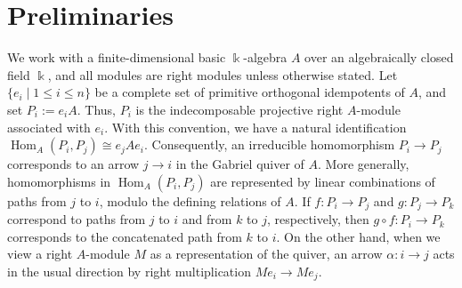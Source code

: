 \documentclass[a4,12pt]{amsart}
\numberwithin{equation}{section} %
\def\Hom{\operatorname{Hom}} %
\theoremstyle{definition} %
\begin{document}
\section{Preliminaries}\label{sec::preliminaries}
We work with a finite-dimensional basic $\Bbbk$-algebra $A$ over an algebraically closed field $\Bbbk$, and all modules are right modules unless otherwise stated. Let $\{e_i\mid 1\leq i\leq n\}$ be a complete set of primitive orthogonal idempotents of $A$, and set $P_i:=e_iA$. Thus, $P_i$ is the indecomposable projective right $A$-module associated with $e_i$. With this convention, we have a natural identification $\Hom_A(P_i,P_j)\cong e_jAe_i$. Consequently, an irreducible homomorphism $P_i\to P_j$ corresponds to an arrow $j\to i$ in the Gabriel quiver of $A$. More generally, homomorphisms in $\Hom_A(P_i,P_j)$ are represented by linear combinations of paths from $j$ to $i$, modulo the defining relations of $A$. If $f\colon P_i\to P_j$ and $g\colon P_j\to P_k$ correspond to paths from $j$ to $i$ and from $k$ to $j$, respectively, then $g\circ f\colon P_i\to P_k$ corresponds to the concatenated path from $k$ to $i$. On the other hand, when we view a right $A$-module $M$ as a representation of the quiver, an arrow $\alpha\colon i\to j$ acts in the usual direction by right multiplication $Me_i\to Me_j$. 
\end{document}
